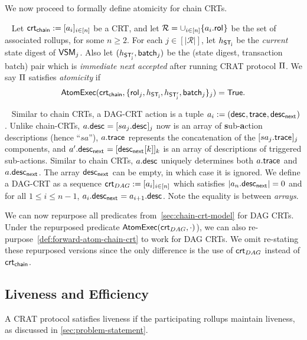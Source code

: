 \noindent We now proceed to formally define atomicity for chain CRTs.

\begin{definition}~\label{def:forward-atom-chain-crt}   
    Let $\mathsf{crt_{chain}} := [a_i]_{i \in [n]}$ be a CRT, 
    and let $\mathcal{R} = \cup_{i \in [n]} \{ a_i.\mathsf{rol}_{} \}$ be the set of associated rollups, for some $n \geq 2$. For each $j \in [|\mathcal{R}|]$, let $h_{\mathsf{ST_{j}}}$ be the \emph{current} state digest of $\mathsf{VSM}_{j}$. Also let $(h_{\mathsf{ST_{j}'}}, \mathsf{batch}_{j})$ be the (state digest, transaction batch) pair which is \emph{immediate next accepted} after running CRAT protocol $\Pi$. We say $\Pi$ satisfies \emph{atomicity} if 
    \begin{align*}
        \mathsf{AtomExec}(\mathsf{crt_{chain}}, \{\mathsf{rol}_{j}, h_{\mathsf{ST_{j}}}, h_{\mathsf{ST_{j}'}}, \mathsf{batch}_{j}\}_j) = \mathsf{True}.
    \end{align*}
\end{definition}




~\label{sec:dag-crt-model}
Similar to chain CRTs, a DAG-CRT action is a tuple $a_i := (\mathsf{desc}_{}, \mathsf{trace}_{}, \mathsf{desc_{next}}_{})$. Unlike chain-CRTs, $a.\mathsf{desc}_{} = [sa_j.\mathsf{desc}_{}]_j$ now is an array of \textbf{s}ub-\textbf{a}ction descriptions (hence ``$sa$''), $a.\mathsf{trace}_{}$ represents the concatenation of the $[sa_j.\mathsf{trace}_{}]_j$ components, and $a'.\mathsf{desc_{next}}_{} = [\mathsf{desc_{next}}_{}[k]]_k $ is an array of descriptions of triggered sub-actions. Similar to chain CRTs, $a.\mathsf{desc}_{}$ uniquely determines both $a.\mathsf{trace}_{}$ and $a.\mathsf{desc_{next}}_{}$. The array $\mathsf{desc_{next}}_{}$ can be empty, in which case it is ignored. We define a DAG-CRT as a sequence $\mathsf{crt}_{DAG} := [a_i]_{i \in [n]}$ which satisfies $|a_n.\mathsf{desc_{next}}_{}| = 0$ and for all $1 \leq i \leq n-1$, $a_i.\mathsf{desc_{next}}_{} = a_{i+1}.\mathsf{desc}_{}$. Note the equality is between \emph{arrays}.


    

We can now repurpose all predicates from~\cref{sec:chain-crt-model} for DAG CRTs. Under the repurposed predicate $\mathsf{AtomExec}{}(\mathsf{crt}_{DAG}, \cdot)$), we can also re-purpose~\cref{def:forward-atom-chain-crt} to work for DAG CRTs. We omit re-stating these repurposed versions since the only difference is the use of $\mathsf{crt}_{DAG}$ instead of $\mathsf{crt_{chain}}$.


\subsection{Liveness and Efficiency}

 A CRAT protocol satisfies liveness if the participating rollups maintain liveness, as discussed in \cref{sec:problem-statement}.

